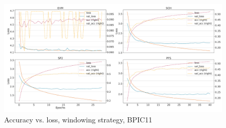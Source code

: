 \begin{figure}[!htb]
    \centering
    \includegraphics[width=\textwidth]{gfx/bpic2011/windowed_loss_acc_curve.pdf}
    \caption{Accuracy vs. loss, windowing strategy, BPIC11}
\end{figure}
\FloatBarrier

